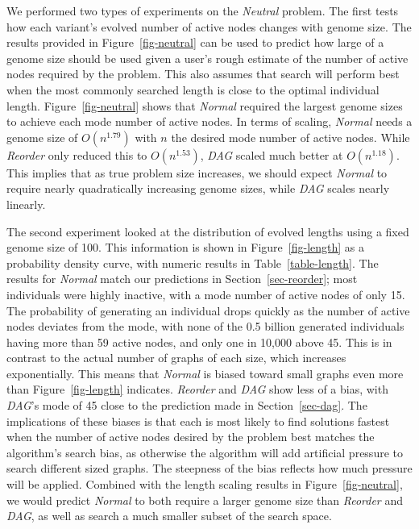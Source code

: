 \documentclass{sig-alternate}
\begin{document}
We performed two types of experiments on the \emph{Neutral} problem.  The first
tests how each variant's evolved number of active nodes changes
with genome size.  The results provided in Figure~\ref{fig-neutral} can be used
to predict how large of a genome size should be used
given a user's rough estimate of the number of active nodes required by the problem.  
This also assumes that search will perform best when the most commonly searched length
is close to the optimal individual length.  Figure~\ref{fig-neutral} shows that \emph{Normal}
required the largest genome sizes to achieve each mode number of active nodes.  In
terms of scaling, \emph{Normal} needs a genome size of $O(n^{1.79})$ with
$n$ the desired mode number of active nodes.  While \emph{Reorder} only reduced
this to $O(n^{1.53})$, \emph{DAG} scaled much better at $O(n^{1.18})$.  This implies
that as true problem size increases, we should expect \emph{Normal} to require nearly
quadratically increasing genome sizes, while \emph{DAG} scales nearly linearly.

The second experiment looked at the distribution of evolved lengths using a fixed
genome size of 100. This
information is shown in Figure~\ref{fig-length} as a probability density curve,
with numeric results in Table~\ref{table-length}.
The results for \emph{Normal} match our predictions in Section~\ref{sec-reorder};
most individuals were highly inactive, with a mode number of
active nodes of only 15.  The probability of generating an individual drops quickly
as the number of active nodes deviates from the mode, with none of the 0.5 billion
generated individuals having more than 59 active nodes, and only one in 10,000 above 45.  This is in contrast
to the actual number of graphs of each size, which increases exponentially.
This means that \emph{Normal} is biased toward small graphs even more than
Figure~\ref{fig-length} indicates.
\emph{Reorder} and \emph{DAG} show less of a bias, with \emph{DAG}'s mode of 45
close to the prediction made in Section~\ref{sec-dag}.  The implications of these
biases is that each is most likely to find solutions fastest when the number of
active nodes desired by the problem best matches the algorithm's search bias, as
otherwise the algorithm will add artificial pressure to search different sized
graphs.  The steepness of the bias reflects how much pressure will be applied.
Combined with the length scaling results in Figure~\ref{fig-neutral}, we would
predict \emph{Normal} to both require a larger genome size than \emph{Reorder} and \emph{DAG},
as well as search a much smaller subset of the search space.
\end{document}
